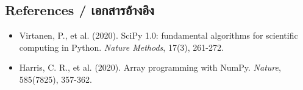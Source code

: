 \subsection{References \quad / \quad \textthai{เอกสารอ้างอิง}}
\begin{itemize}
    \item Virtanen, P., et al. (2020). SciPy 1.0: fundamental algorithms for scientific computing in Python. \textit{Nature Methods}, 17(3), 261-272.
    \item Harris, C. R., et al. (2020). Array programming with NumPy. \textit{Nature}, 585(7825), 357-362.
\end{itemize}
